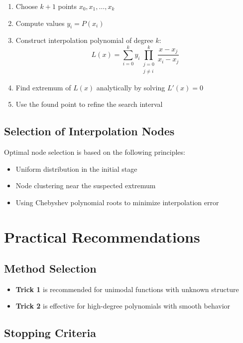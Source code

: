 \documentclass[12pt,a4paper]{article}
\begin{document}
\begin{enumerate}
    \item Choose $k+1$ points $x_0, x_1, \ldots, x_k$
    \item Compute values $y_i = P(x_i)$
    \item Construct interpolation polynomial of degree $k$:
    \begin{equation}
        L(x) = \sum_{i=0}^k y_i \prod_{\substack{j=0\\j \neq i}}^k \frac{x - x_j}{x_i - x_j}
    \end{equation}
    \item Find extremum of $L(x)$ analytically by solving $L'(x) = 0$
    \item Use the found point to refine the search interval
\end{enumerate}

\subsection{Selection of Interpolation Nodes}

Optimal node selection is based on the following principles:
\begin{itemize}
    \item Uniform distribution in the initial stage
    \item Node clustering near the suspected extremum
    \item Using Chebyshev polynomial roots to minimize interpolation error
\end{itemize}

\section{Practical Recommendations}

\subsection{Method Selection}

\begin{itemize}
    \item \textbf{Trick 1} is recommended for unimodal functions with unknown structure
    \item \textbf{Trick 2} is effective for high-degree polynomials with smooth behavior
\end{itemize}

\subsection{Stopping Criteria}
\end{document}
